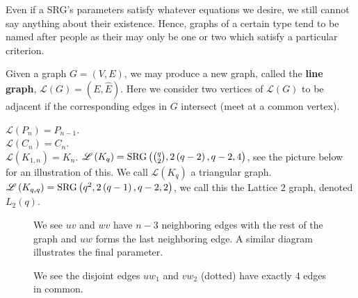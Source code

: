 \newpage
{}
\begin{recall}
	Even if a SRG's parameters satisfy whatever equations we desire, we still cannot say anything about their existence. Hence, graphs of a certain type tend to be named after people as their may only be one or two which satisfy a particular criterion.
\end{recall}
\begin{definition}
	Given a graph \(G= \left( V, E \right) \), we may produce a new graph, called the \textbf{line graph}, \(\mathscr{L}\left( G \right)= \left( E, \hat{E} \right) \). Here we consider two vertices of \(\mathscr{L}\left( G \right) \) to be adjacent if the corresponding edges in \(G\) intersect (meet at a common vertex).
\end{definition}
\begin{example}
	\(\mathscr{L}\left( P_{n} \right) = P_{n-1}\).\\
	\(\mathscr{L}\left( C_{n} \right) = C_{n} \).\\
	\(\mathscr{L}\left( K_{1, n} \right) = K_{n} \).
	\(\mathscr{L}\left( K_{q} \right) = \operatorname{SRG}\left( \binom{q}{2}, 2\left( q-2 \right), q-2, 4 \right)  \), see the picture below for an illustration of this. We call \(\mathscr{L}\left( K_q \right) \) a triangular graph.
	\(\mathscr{L}\left( K_{q, q} \right) = \operatorname{SRG}\left(q^2, 2\left( q-1 \right),q-2, 2    \right)  \), we call this the Lattice \(2\) graph, denoted \(L_{2}\left( q \right) \).
\end{example}
\begin{figure}[ht]
    \centering
    \caption{We see \(uv\) and \(wv\) have \(n-3\) neighboring edges with the rest of the graph and \(uw\) forms the last neighboring edge. A similar diagram illustrates the final parameter.}
    \label{fig:linekq}
\end{figure}
\begin{figure}[ht]
    \centering
    \caption{We see the disjoint edges \(uw_1\) and \(vw_2\) (dotted) have exactly \(4\) edges in common.}
    \label{fig:linekq2}
\end{figure}

